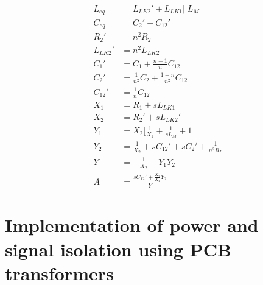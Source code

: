 \documentclass[conference]{IEEEtran}
\begin{document}
\begin{align*}
	L_{eq}   &= L_{LK2}'+L_{LK1}||L_{M} 	\\
	C_{eq}   &= C_{2}'+C_{12}'				\\
	R_{2}'   &= n^{2}R_{2}					\\
	L_{LK2}' &= n^{2}L_{LK2}				\\
	C_{1}'   &= C_{1} + \frac{n-1}{n}C_{12}	\\
	C_{2}'   &= \frac{1}{n^{2}}C_{2} + \frac{1-n}{n^{2}}C_{12}	\\
	C_{12}'  &= \frac{1}{n}C_{12}			\\
	X_{1}    &= R_{1}  + sL_{LK1}			\\
	X_{2}    &= R_{2}' + sL_{LK2}'			\\
	Y_{1}    &= X_{2} \lbrack \frac{1}{X_{1}} + \frac{1}{sL_{M}}+1	\\
	Y_{2}    &= \frac{1}{X_{2}} + sC_{12}' + sC_{2}' + \frac{1}{n^{2}R_{L}}	\\
	Y        &= -\frac{1}{X_{2}} + Y_{1}Y_{2}	\\
	A        &= \frac{sC_{12}' + \frac{X_{2}}{X_{1}} Y_{2}}{Y}
\end{align*}


\section{Implementation of power and signal isolation using PCB transformers}
\end{document}
